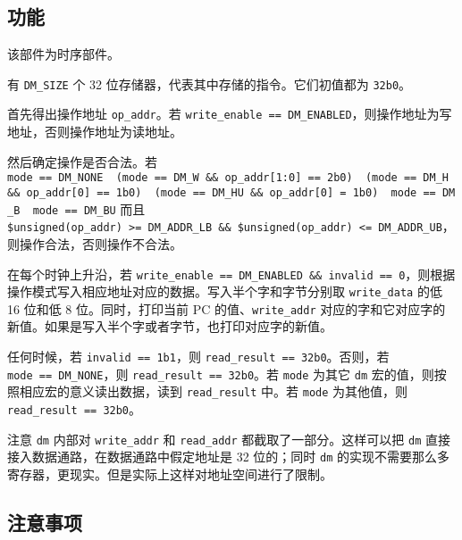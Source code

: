 \documentclass[12pt,AutoFakeBold,AutoFakeSlant]{article}
\begin{document}
\hypertarget{ux529fux80fd-9}{%
\subsection{功能}\label{ux529fux80fd-9}}

该部件为时序部件。

有 \texttt{DM\_SIZE} 个 32 位存储器，代表其中存储的指令。它们初值都为
\texttt{32\textquotesingle{}b0}。

首先得出操作地址 \texttt{op\_addr}。若
\texttt{write\_enable\ ==\ DM\_ENABLED}，则操作地址为写地址，否则操作地址为读地址。

然后确定操作是否合法。若
\texttt{mode\ ==\ DM\_NONE\ \textbar{}\textbar{}\ (mode\ ==\ DM\_W\ \&\&\ op\_addr{[}1:0{]}\ ==\ 2\textquotesingle{}b0)\ \textbar{}\textbar{}\ (mode\ ==\ DM\_H\ \&\&\ op\_addr{[}0{]}\ ==\ 1\textquotesingle{}b0)\ \textbar{}\textbar{}\ (mode\ ==\ DM\_HU\ \&\&\ op\_addr{[}0{]}\ =\ 1\textquotesingle{}b0)\ \textbar{}\textbar{}\ mode\ ==\ DM\_B\ \textbar{}\textbar{}\ mode\ ==\ DM\_BU}
而且
\texttt{\$unsigned(op\_addr)\ \textgreater{}=\ DM\_ADDR\_LB\ \&\&\ \$unsigned(op\_addr)\ \textless{}=\ DM\_ADDR\_UB}，则操作合法，否则操作不合法。

在每个时钟上升沿，若
\texttt{write\_enable\ ==\ DM\_ENABLED\ \&\&\ invalid\ ==\ 0}，则根据操作模式写入相应地址对应的数据。写入半个字和字节分别取
\texttt{write\_data} 的低 16 位和低 8 位。同时，打印当前 PC
的值、\texttt{write\_addr}
对应的字和它对应字的新值。如果是写入半个字或者字节，也打印对应字的新值。

任何时候，若 \texttt{invalid\ ==\ 1\textquotesingle{}b1}，则
\texttt{read\_result\ ==\ 32\textquotesingle{}b0}。否则，若
\texttt{mode\ ==\ DM\_NONE}，则
\texttt{read\_result\ ==\ 32\textquotesingle{}b0}。若 \texttt{mode}
为其它 \texttt{dm} 宏的值，则按照相应宏的意义读出数据，读到
\texttt{read\_result} 中。若 \texttt{mode} 为其他值，则
\texttt{read\_result\ ==\ 32\textquotesingle{}b0}。

注意 \texttt{dm} 内部对 \texttt{write\_addr} 和 \texttt{read\_addr}
都截取了一部分。这样可以把 \texttt{dm}
直接接入数据通路，在数据通路中假定地址是 32 位的；同时 \texttt{dm}
的实现不需要那么多寄存器，更现实。但是实际上这样对地址空间进行了限制。

\hypertarget{ux6ce8ux610fux4e8bux9879-6}{%
\subsection{注意事项}\label{ux6ce8ux610fux4e8bux9879-6}}
\end{document}
